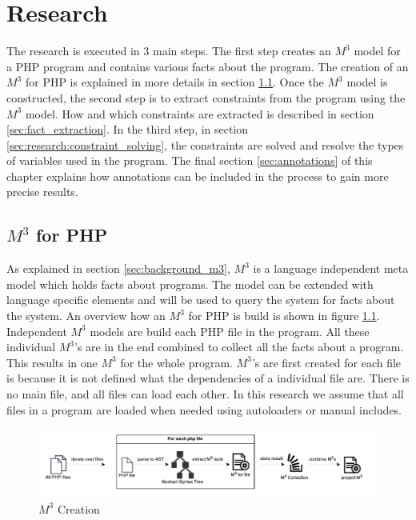 \documentclass[../main.tex]{subfiles}
\begin{document}
    \chapter{Research}\label{chap:research}

    The research is executed in 3 main steps.
    The first step creates an $M^3$ model for a PHP program and contains various facts about the program. 
    The creation of an $M^3$ for PHP is explained in more details in section \ref{sec:m3_for_php}.
    Once the $M^3$ model is constructed, the second step is to extract constraints from the program using the $M^3$ model. How and which constraints are extracted is described in section \ref{sec:fact_extraction}.
    In the third step, in section \ref{sec:research:constraint_solving}, the constraints are solved and resolve the types of variables used in the program.
    The final section \ref{sec:annotations} of this chapter explains how annotations can be included in the process to gain more precise results.
    
    \section{$M^3$ for PHP}\label{sec:m3_for_php}
    As explained in section \ref{sec:background_m3}, $M^3$ is a language independent meta model which holds facts about programs.
    The model can be extended with language specific elements and will be used to query the system for facts about the system.
    An overview how an $M^3$ for PHP is build is shown in figure \ref{fig:research_m3_creation}.
    Independent $M^3$ models are build each PHP file in the program.
    All these individual $M^3$'s are in the end combined to collect all the facts about a program.
    This results in one $M^3$ for the whole program.
    $M^3$'s are first created for each file is because it is not defined what the dependencies of a individual file are.
    There is no main file, and all files can load each other.
    In this research we assume that all files in a program are loaded when needed using autoloaders or manual includes.
    
    \begin{figure}[H]
        \centerline{\includegraphics{Diagrams/M3Creation.pdf}}
        \caption{$M^3$ Creation}
        \label{fig:research_m3_creation}
    \end{figure}
\end{document}
